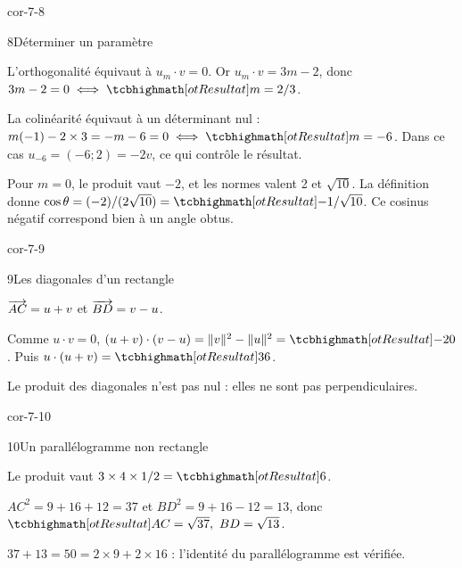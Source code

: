\begin{blocLivre}{cor-7-8}
\begin{corrige}{8}{Déterminer un paramètre}
\begin{questions}
\item L’orthogonalité équivaut à $u_m\cdot v=0$.
Or $u_m\cdot v=3m-2$, donc $3m-2=0\iff\res{m=2/3}$.
\item La colinéarité équivaut à un déterminant nul :
$m(-1)-2\times3=-m-6=0\iff\res{m=-6}$.
Dans ce cas $u_{-6}=(-6;2)=-2v$, ce qui contrôle le résultat.
\item Pour $m=0$, le produit vaut $-2$, et les normes valent 2 et $\sqrt{10}$.
La définition donne $\cos\theta=(-2)/(2\sqrt{10})=\res{-1/\sqrt{10}}$.
Ce cosinus négatif correspond bien à un angle obtus.
\end{questions}
\label{figgeo-07-08-cor}
\end{corrige}
\end{blocLivre}
\begin{blocLivre}{cor-7-9}
\begin{corrige}{9}{Les diagonales d'un rectangle}
\begin{questions}
\item $\overrightarrow{AC}=u+v$ et $\overrightarrow{BD}=v-u$.
\item Comme $u\cdot v=0$, $(u+v)\cdot(v-u)=\|v\|^2-\|u\|^2=\res{-20}$. Puis $u\cdot(u+v)=\res{36}$.
\item Le produit des diagonales n’est pas nul : elles ne sont pas perpendiculaires.
\end{questions}

\label{figgeo-07-09-cor}
\end{corrige}
\end{blocLivre}
\begin{blocLivre}{cor-7-10}
\begin{corrige}{10}{Un parallélogramme non rectangle}
\begin{questions}
\item Le produit vaut $3\times4\times1/2=\res{6}$.
\item $AC^2=9+16+12=37$ et $BD^2=9+16-12=13$, donc $\res{AC=\sqrt{37},\ BD=\sqrt{13}}$.
\item $37+13=50=2\times9+2\times16$ : l’identité du parallélogramme est vérifiée.
\end{questions}

\label{figgeo-07-10-cor}
\end{corrige}
\end{blocLivre}
